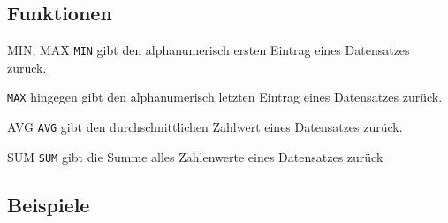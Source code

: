\subsection{Funktionen}

\begin{sql}{MIN, MAX}
    \texttt{MIN} gibt den alphanumerisch ersten Eintrag eines Datensatzes zurück.

    \texttt{MAX} hingegen gibt den alphanumerisch letzten Eintrag eines Datensatzes zurück.
\end{sql}

\begin{sql}{AVG}
    \texttt{AVG} gibt den durchschnittlichen Zahlwert eines Datensatzes zurück.
\end{sql}

\begin{sql}{SUM}
    \texttt{SUM} gibt die Summe alles Zahlenwerte eines Datensatzes zurück
\end{sql}

\subsection{Beispiele}

